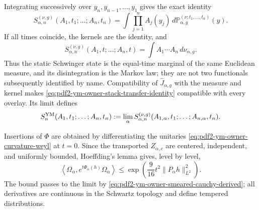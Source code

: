 Integrating successively over $y_n,y_{n-1},\ldots,y_1$ gives the exact identity
\begin{equation}\label{eq:pdf2-ym-owner-stack-transfer-identity}
 S_{\alpha,n}^{(\nu,g)}(A_1,t_1;\ldots;A_n,t_n)
 =\int\prod_{j=1}^nA_j(y_j)\,
   d\mathbb P_{\alpha,g}^{(\nu;t_1,\ldots,t_n)}(y).
\end{equation}
If all times coincide, the kernels are the identity, and
\begin{equation}\label{eq:pdf2-ym-owner-static-is-stack}
 S_{\alpha,n}^{(\nu,g)}(A_1,t;\ldots;A_n,t)
 =\int A_1\cdots A_n\,d\nu_{\alpha,g}.
\end{equation}
Thus the static Schwinger state is the equal-time marginal of the same
Euclidean measure, and its disintegration is the Markov law; they are not two functionals
subsequently identified by name.
Compatibility of $\widehat J_{\alpha,g}$ with the measure and kernel makes
\eqref{eq:pdf2-ym-owner-stack-transfer-identity} compatible with every overlay. Its limit defines
\begin{equation}\label{eq:pdf2-ym-owner-schwinger-functionals}
 S_n^{\rm YM}(A_1,t_1;\ldots;A_n,t_n)
 :=\lim_{\alpha}S_{\alpha,n}^{(\nu,g)}
 (A_{1,\alpha},t_1;\ldots;A_{n,\alpha},t_n).
\end{equation}

Insertions of $\Phi$ are obtained by differentiating the unitaries
\eqref{eq:pdf2-ym-owner-curvature-weyl} at $t=0$. Since the transported $Z_{\alpha,c}$
are centered, independent, and uniformly bounded, Hoeffding's lemma gives,
level by level,
\begin{equation}\label{eq:pdf2-ym-owner-subgaussian-bound}
 \left\langle\Omega_\alpha,
 e^{t\Phi_\alpha(h)}\Omega_\alpha\right\rangle
 \le \exp\!\left(\frac9{16}t^2\|P_\alpha h\|_{L^2}^2\right).
\end{equation}
The bound passes to the limit by
\eqref{eq:pdf2-ym-owner-smeared-cauchy-derived}; all derivatives are continuous in
the Schwartz topology and define tempered distributions.

